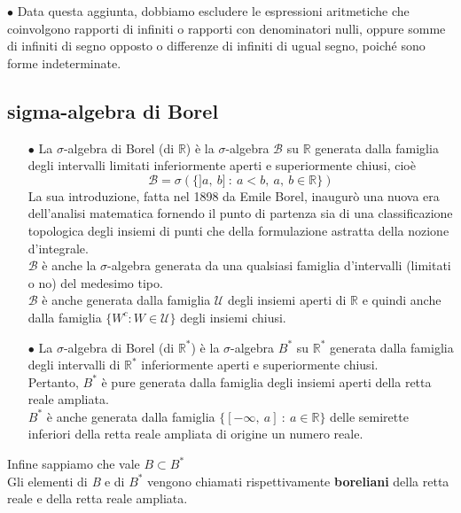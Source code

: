 \documentclass[a4paper,11pt]{article}
\theoremstyle{plain}
\theoremstyle{definition}
\theoremstyle{remark}
\begin{document}
$\bullet$ Data questa aggiunta, dobbiamo escludere le  espressioni aritmetiche che coinvolgono rapporti di infiniti o rapporti con denominatori nulli, oppure
somme di infiniti di segno opposto o differenze di infiniti di ugual segno, poiché sono forme indeterminate.


\subsection{sigma-algebra di Borel}
\begin{itemize}
    \item[$\bullet$]  La $\sigma$-algebra di Borel (di $\mathbb{R}$) è la $\sigma$-algebra $\mathcal{B}$ su $\mathbb{R}$ generata dalla famiglia degli intervalli limitati inferiormente aperti $\mathrm{e}$ superiormente chiusi, cioè
$$\mathcal{B}=\sigma(\{]a,\ b]\ :\ a<b,\ a,\ b\in \mathbb{R}\})$$
La sua introduzione, fatta nel 1898 da Emile Borel, inaugurò una nuova era dell’analisi
matematica fornendo il punto di partenza sia di una classificazione topologica degli insiemi
di punti che della formulazione astratta della nozione d’integrale.\\

$\mathcal{B}$ è anche la $\sigma$-algebra generata da una qualsiasi famiglia d'intervalli (limitati o no) del medesimo tipo.\\

$\mathcal{B}$ è anche generata dalla famiglia $\mathcal{U}$ degli insiemi aperti di $\mathbb{R}$ e quindi anche dalla famiglia $\{W^{c}:W\in \mathcal{U}\}$ degli insiemi chiusi.\\

\item[$\bullet$] La $\sigma$-algebra di Borel (di $\mathbb{R}^{*}$) è la $\sigma$-algebra $B^{*}$ su $\mathbb{R}^{*}$ generata dalla famiglia degli intervalli di $\mathbb{R}^{*}$ inferiormente aperti $\mathrm{e}$ superiormente chiusi.\\

Pertanto, $B^{*}$ è pure generata dalla famiglia degli insiemi aperti della retta reale ampliata.\\

$B^{*}$ è anche generata dalla famiglia $\{[-\infty,\ a]\ :\ a\in \mathbb{R}\}$ delle semirette inferiori della retta reale ampliata di origine un numero reale.
\end{itemize}
Infine sappiamo che vale $B\subset B^{*}$\\

Gli elementi di {\it B} e di $B^{*}$ vengono chiamati rispettivamente \textbf{boreliani} della retta reale $\mathrm{e}$ della retta reale ampliata.
\end{document}
